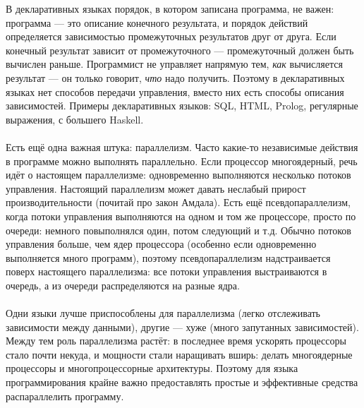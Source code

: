 \documentclass[11pt]{book}
\begin{document}
В декларативных языках порядок, в котором записана программа, не важен:
программа --- это описание конечного результата, и порядок действий определяется зависимостью
промежуточных результатов друг от друга.
Если конечный результат зависит от промежуточного --- промежуточный должен быть вычислен раньше.
Программист не управляет напрямую тем, \emph{как} вычисляется результат --- он только говорит, \emph{что} надо получить.
Поэтому в декларативных языках нет способов передачи управления, вместо них есть способы описания зависимостей.
Примеры декларативных языков: SQL, HTML, Prolog, регулярные выражения, с большего Haskell.
\\ \\
Есть ещё одна важная штука: параллелизм.
Часто какие-то независимые действия в программе можно выполнять параллельно.
Если процессор многоядерный, речь идёт о настоящем параллелизме: одновременно выполняются несколько потоков управления.
Настоящий параллелизм может давать неслабый прирост производительности (почитай про закон Амдала).
Есть ещё псевдопараллелизм, когда потоки управления выполняются на одном и том же процессоре,
просто по очереди: немного повыполнялся один, потом следующий и т.д.
Обычно потоков управления больше, чем ядер процессора (особенно если одновременно выполняется много программ),
поэтому псевдопараллелизм надстраивается поверх настоящего параллелизма:
все потоки управления выстраиваются в очередь, а из очереди распределяются на разные ядра.
\\ \\
Одни языки лучше приспособлены для параллелизма (легко отслеживать зависимости между данными),
другие --- хуже (много запутанных зависимостей).
Между тем роль параллелизма растёт: в последнее время ускорять процессоры стало почти некуда,
и мощности стали наращивать вширь: делать многоядерные процессоры и многопроцессорные архитектуры.
Поэтому для языка программирования крайне важно предоставлять простые и эффективные средства распараллелить программу.
\end{document}
